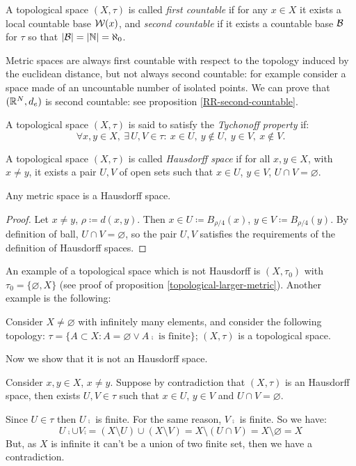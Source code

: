 \begin{defn}\label{first-second-countable}
	A topological space $(X, \tau)$ is called \emph{first countable} if for any $x \in X$ it exists a local countable base $\mathcal W(x)$, and \emph{second countable} if it exists a countable base $\mathcal B$ for $\tau$ so that $|\mathcal B| = |\mathbb N| = \aleph_0$.
\end{defn}

Metric spaces are always first countable with respect to the topology induced by the euclidean distance, but not always second countable: for example consider a space made of an uncountable number of isolated points. We can prove that $(\mathbb R^N, d_e)$ is second countable: see proposition \vref{RR-second-countable}.


\begin{defn}
	A topological space $(X, \tau)$ is said to satisfy the \emph{Tychonoff property}\footnotemark{} if:
	$$
		\forall x,y \in X, \ 
		\exists \, U,V \in \tau: \ 
		x \in U,\  y \notin U, \ y \in V,\ x \notin V
	.
	$$
\end{defn}

\begin{defn} \label{defn-hausdorff-space}
	A topological space $(X, \tau)$ is called \emph{Hausdorff space} if for all $x, y \in X$, with $x \neq y$,  it exists a pair $U, V$ of open sets such that $x \in U$, $y \in V$, $U \cap V = \varnothing$.
\end{defn}

\begin{prop}
	Any metric space is a Hausdorff space.
\end{prop}
\begin{proof}
	Let $x \neq y$, $\rho \coloneqq d(x, y)$. Then $x \in U \coloneqq B_{\rho/4}(x)$, $y \in V \coloneqq B_{\rho/4}(y)$. By definition of ball, $U \cap V = \varnothing$, so the pair $U, V$ satisfies the requirements of the definition of Hausdorff spaces.
\end{proof}
An example of a topological space which is not Hausdorff is $(X, \tau_0)$ with $\tau_0 = \{\varnothing, X\}$ (see proof of proposition \vref{topological-larger-metric}). Another example is the following:
\begin{exam}
	Consider $X \neq \varnothing$ with infinitely many elements, and consider the following topology: $\tau=\{A \subset X : A=\varnothing \vee A\comp \text{ is finite}\}$; $(X, \tau)$ is a topological space.
	
	Now we show that it is not an Hausdorff space.
	
	Consider $x,y \in X$, $x\neq y$. Suppose by contradiction that $(X,\tau)$ is an Hausdorff space, then exists $U, V \in \tau$ such that $x\in U$, $y\in V$ and $U \cap V = \varnothing$.
	
	Since $U \in \tau$ then $U\comp$ is finite. For the same reason, $V\comp$ is finite. So we have:
	$$ U\comp \cup V\comp = (X\setminus U) \cup (X \setminus V) = X \setminus (U \cap V) = X \setminus \varnothing = X$$
	But, as $X$ is infinite it can't be a union of two finite set, then we have a contradiction.
\end{exam}

